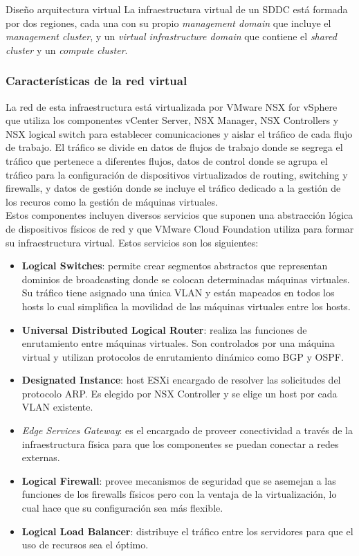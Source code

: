 \begin{subsection}{Diseño arquitectura virtual}
La infraestructura virtual de un SDDC está formada por dos regiones, cada una con su propio \textit{management domain} que incluye el \textit{management cluster}, y un \textit{virtual infrastructure domain} que contiene el \textit{shared cluster} y un \textit{compute cluster}.

\subsubsection{Características de la red virtual}
La red de esta infraestructura está virtualizada por VMware NSX for vSphere que utiliza los componentes vCenter Server, NSX Manager, NSX Controllers y NSX logical switch para establecer comunicaciones y aislar el tráfico de cada flujo de trabajo. El tráfico se divide en datos de flujos de trabajo donde se segrega el tráfico que pertenece a diferentes flujos, datos de control donde se agrupa el tráfico para la configuración de dispositivos virtualizados de routing, switching y firewalls, y datos de gestión donde se incluye el tráfico dedicado a la gestión de los recuros como la gestión de máquinas virtuales.\\

Estos componentes incluyen diversos servicios que suponen una abstracción lógica de dispositivos físicos de red y que VMware Cloud Foundation utiliza para formar su infraestructura virtual. Estos servicios son los siguientes:
\begin{itemize}
    \item \textbf{Logical Switches}: permite crear segmentos abstractos que representan dominios de broadcasting donde se colocan determinadas máquinas virtuales. Su tráfico tiene asignado una única VLAN y están mapeados en todos los hosts lo cual simplifica la movilidad de las máquinas virtuales entre los hosts.
    \item \textbf{Universal Distributed Logical Router}: realiza las funciones de enrutamiento entre máquinas virtuales. Son controlados por una máquina virtual y utilizan protocolos de enrutamiento dinámico como BGP y OSPF.
    \item \textbf{Designated Instance}: host ESXi encargado de resolver las solicitudes del protocolo ARP. Es elegido por NSX Controller y se elige un host por cada VLAN existente.
    \item \textit{Edge Services Gateway}: es el encargado de proveer conectividad a través de la infraestructura física para que los componentes se puedan conectar a redes externas.
    \item \textbf{Logical Firewall}: provee mecanismos de seguridad que se asemejan a las funciones de los firewalls físicos pero con la ventaja de la virtualización, lo cual hace que su configuración sea más flexible.
    \item \textbf{Logical Load Balancer}: distribuye el tráfico entre los servidores para que el uso de recursos sea el óptimo.
\end{itemize}

\end{subsection}
